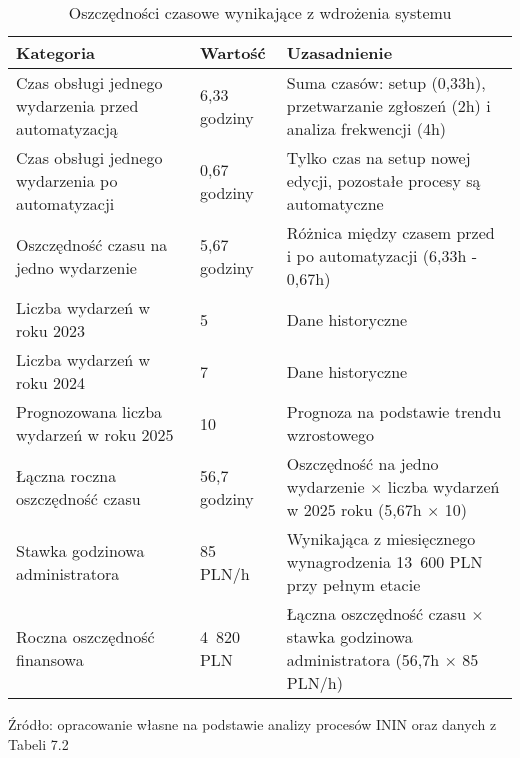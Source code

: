 \begin{table}[ht]
    \centering
    \caption[Oszczędności czasowe wynikające z wdrożenia systemu, źródło: opracowanie własne na podstawie analizy procesów ININ oraz danych z Tabeli 7.2]{Oszczędności czasowe wynikające z wdrożenia systemu}
    \label{tab:oszczednosci_czasowe}
    \renewcommand{\arraystretch}{1.3} %
    \begin{tabular}{| p{} | p{} | p{} |}
        \hline
        \textbf{Kategoria} & \textbf{Wartość} & \textbf{Uzasadnienie} \\
        \hline
        Czas obsługi jednego wydarzenia przed automatyzacją & 6,33 godziny & Suma czasów: setup (0,33h), przetwarzanie zgłoszeń (2h) i analiza frekwencji (4h) \\
        \hline
        Czas obsługi jednego wydarzenia po automatyzacji & 0,67 godziny & Tylko czas na setup nowej edycji, pozostałe procesy są automatyczne \\
        \hline
        Oszczędność czasu na jedno wydarzenie & 5,67 godziny & Różnica między czasem przed i po automatyzacji (6,33h - 0,67h) \\
        \hline
        Liczba wydarzeń w roku 2023 & 5 & Dane historyczne \\
        \hline
        Liczba wydarzeń w roku 2024 & 7 & Dane historyczne \\
        \hline
        Prognozowana liczba wydarzeń w roku 2025 & 10 & Prognoza na podstawie trendu wzrostowego \\
        \hline
        Łączna roczna oszczędność czasu & 56,7 godziny & Oszczędność na jedno wydarzenie $\times$ liczba wydarzeń w 2025 roku (5,67h $\times$ 10) \\
        \hline
        Stawka godzinowa administratora & 85 PLN/h & Wynikająca z miesięcznego wynagrodzenia 13~600 PLN przy pełnym etacie \\
        \hline
        Roczna oszczędność finansowa & 4~820 PLN & Łączna oszczędność czasu $\times$ stawka godzinowa administratora (56,7h $\times$ 85 PLN/h) \\
        \hline
    \end{tabular}
    \vspace{0.5em}
    \par\raggedright\footnotesize{Źródło: opracowanie własne na podstawie analizy procesów ININ oraz danych z Tabeli 7.2}
\end{table}

